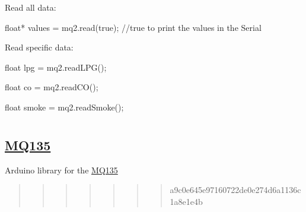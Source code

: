 Read all data\+: 
\begin{DoxyPre}{\ttfamily 
  float* values = mq2.read(true); //true to print the values in the Serial
}\end{DoxyPre}


Read specific data\+: 
\begin{DoxyPre}{\ttfamily 
  float lpg = mq2.readLPG();}\end{DoxyPre}



\begin{DoxyPre}{\ttfamily   float co = mq2.readCO();}\end{DoxyPre}



\begin{DoxyPre}{\ttfamily   float smoke = mq2.readSmoke();
\section*{}}\end{DoxyPre}



\begin{DoxyPre}{\ttfamily 
\section*{\hyperlink{class_m_q135}{MQ135}
}}\end{DoxyPre}



\begin{DoxyPre}{\ttfamily }\end{DoxyPre}



\begin{DoxyPre}{\ttfamily Arduino library for the \hyperlink{class_m_q135}{MQ135}
\begin{quote}
\begin{quote}
\begin{quote}
\begin{quote}
\begin{quote}
\begin{quote}
\begin{quote}
a9c0e645e97160722de0e274d6a1136c1a8e1e4b\end{quote}
\end{quote}
\end{quote}
\end{quote}
\end{quote}
\end{quote}
\end{quote}
}\end{DoxyPre}
